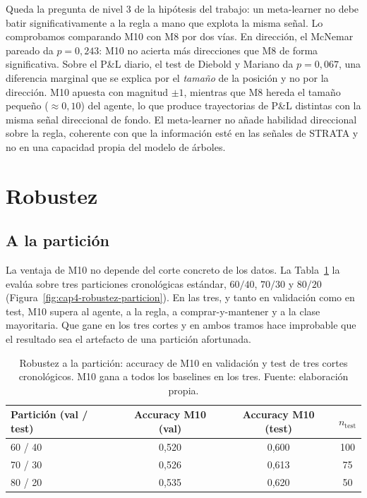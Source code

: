 Queda la pregunta de nivel 3 de la hipótesis del trabajo: un meta-learner no debe batir significativamente a la regla a mano que explota la misma señal. Lo comprobamos comparando M10 con M8 por dos vías. En dirección, el McNemar pareado da $p=0{,}243$: M10 no acierta más direcciones que M8 de forma significativa. Sobre el P\&L diario, el test de Diebold y Mariano \cite{diebold1995} da $p=0{,}067$, una diferencia marginal que se explica por el \emph{tamaño} de la posición y no por la dirección. M10 apuesta con magnitud $\pm 1$, mientras que M8 hereda el tamaño pequeño ($\approx 0{,}10$) del agente, lo que produce trayectorias de P\&L distintas con la misma señal direccional de fondo. El meta-learner no añade habilidad direccional sobre la regla, coherente con que la información esté en las señales de STRATA y no en una capacidad propia del modelo de árboles.

\section{Robustez}
\label{sec:smci-robustez}

\subsection{A la partición}
\label{sec:smci-rob-particion}

La ventaja de M10 no depende del corte concreto de los datos. La Tabla~\ref{tab:smci-robustez} la evalúa sobre tres particiones cronológicas estándar, $60/40$, $70/30$ y $80/20$ (Figura~\ref{fig:cap4-robustez-particion}). En las tres, y tanto en validación como en test, M10 supera al agente, a la regla, a comprar-y-mantener y a la clase mayoritaria. Que gane en los tres cortes y en ambos tramos hace improbable que el resultado sea el artefacto de una partición afortunada.

\begin{table}[htbp]
\centering
\caption{Robustez a la partición: accuracy de M10 en validación y test de tres cortes cronológicos. M10 gana a todos los baselines en los tres. Fuente: elaboración propia.}
\label{tab:smci-robustez}
\begin{tabular}{lccc}
\hline
Partición (val / test) & Accuracy M10 (val) & Accuracy M10 (test) & $n_{\text{test}}$ \\
\hline
60 / 40 & 0,520 & 0,600 & 100 \\
70 / 30 & 0,526 & 0,613 & 75 \\
80 / 20 & 0,535 & 0,620 & 50 \\
\hline
\end{tabular}
\end{table}

